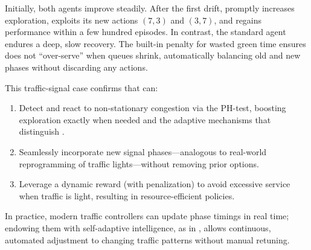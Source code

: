 Initially, both agents improve steadily. After the first drift, \adaptiverl promptly increases exploration, exploits its new actions $(7,3)$ and $(3,7)$, and regains performance within a few hundred episodes. In contrast, the standard agent endures a deep, slow recovery. The built-in penalty for wasted green time ensures \adaptiverl does not “over-serve” when queues shrink, automatically balancing old and new phases without discarding any actions.

This traffic-signal case confirms that \adaptiverl can:
\begin{enumerate}
  \item Detect and react to non-stationary congestion via the PH-test, boosting exploration exactly when needed and the adaptive mechanisms that distinguish \adaptiverl.
  \item Seamlessly incorporate new signal phases---analogous to real-world reprogramming of traffic lights---without removing prior options.
  \item Leverage a dynamic reward (with penalization) to avoid excessive service when traffic is light, resulting in resource-efficient policies.
\end{enumerate}
In practice, modern traffic controllers can update phase timings in real time; endowing them with self-adaptive intelligence, as in \adaptiverl, allows continuous, automated adjustment to changing traffic patterns without manual retuning.


\endinput

